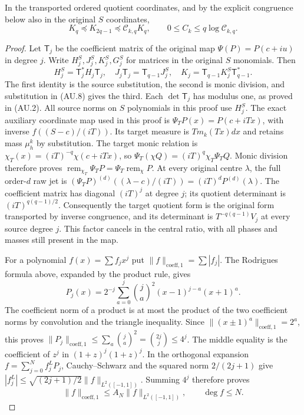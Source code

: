 \begin{theorem}
In the transported ordered quotient coordinates, and by the explicit
congruence below also in the original $S$ coordinates,
\[
 \boxed{K_q\preceq K_{2q-1}\preceq\mathcal C_{k,q}K_q,
 \qquad 0\le C_k\le q\log\mathcal C_{k,q}.}               \tag{AU.25}
\]
\end{theorem}
\begin{proof}
Let $\mathsf T_j$ be the coefficient matrix of the original map
$\Psi(P)=P(c+iu)$ in degree $j$. Write $H_j^S,J_j^S,K_j^S,G_j^S$
for matrices in the original $S$ monomials. Then
\[
 H_j^S=\mathsf T_j^*H_j\mathsf T_j,\quad
 J_j\mathsf T_j=\mathsf T_{q-1}J_j^S,\quad
 K_j=\mathsf T_{q-1}K_j^S\mathsf T_{q-1}^*.
\]
The first identity is the source substitution, the second is monic
division, and substitution in (AU.8) gives the third. Each
$\det\mathsf T_j$ has modulus one, as proved in (AU.2).
All source norms on $S$ polynomials in this proof use $H_j^S$.
The exact auxiliary coordinate map used in this proof is
$\Psi_TP(x)=P(c+iTx)$, with inverse $f((S-c)/(iT))$. Its target
measure is $T m_k(Tx)dx$ and retains mass $\mu_h^k$ by substitution.
The target monic relation is
$\chi_T(x)=(iT)^{-q}\chi(c+iTx)$, so
$\Psi_T(\chi Q)=(iT)^q\chi_T\Psi_TQ$.
Monic division therefore proves
$\operatorname{rem}_{\chi_T}\Psi_TP=\Psi_T\operatorname{rem}_\chi P$.
At every original centre $\lambda$, the full order-$d$ raw jet is
$(\Psi_TP)^{(d)}((\lambda-c)/(iT))=(iT)^dP^{(d)}(\lambda)$.
The coefficient matrix has diagonal $(iT)^j$ at degree $j$;
its quotient determinant is $(iT)^{q(q-1)/2}$. Consequently the
target quotient form is the original form transported by inverse
congruence, and its determinant is $T^{-q(q-1)}V_j$ at every source
degree $j$. This factor cancels in the central ratio, with all phases
and masses still present in the map.

For a polynomial $f(x)=\sum f_jx^j$ put
$\|f\|_{\mathrm{coeff},1}=\sum|f_j|$. The Rodrigues formula above,
expanded by the product rule, gives
\[
 P_j(x)=2^{-j}\sum_{a=0}^j\binom ja^2(x-1)^{j-a}(x+1)^a.
\]
The coefficient norm of a product is at most the product of the two
coefficient norms by convolution and the triangle inequality. Since
$\|(x\pm1)^a\|_{\mathrm{coeff},1}=2^a$, this proves
$\|P_j\|_{\mathrm{coeff},1}\le\sum_a\binom ja^2
=\binom{2j}{j}\le4^j$. The middle equality is the coefficient of
$z^j$ in $(1+z)^j(1+z)^j$. In the orthogonal expansion
$f=\sum_{j=0}^Nf_j^LP_j$, Cauchy--Schwarz and the squared norm
$2/(2j+1)$ give
$|f_j^L|\le\sqrt{(2j+1)/2}\|f\|_{L^2([-1,1])}$.
Summing $4^j$ therefore proves
\[
 \|f\|_{\mathrm{coeff},1}
       \le A_N\|f\|_{L^2([-1,1])},\qquad\deg f\le N.    \tag{AU.26}
\]


\end{proof}
